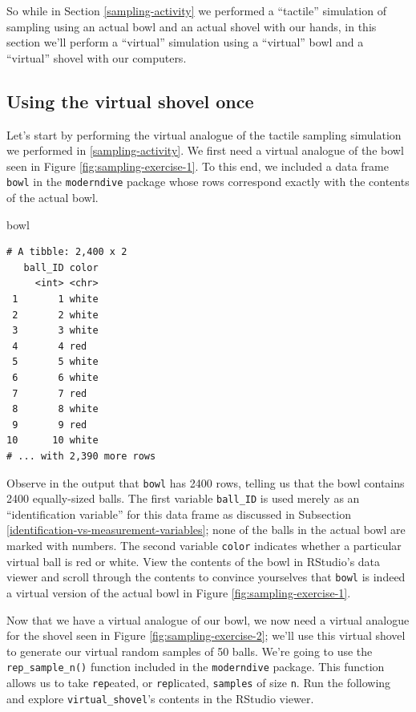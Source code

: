 \documentclass[12pt, krantz2,]{krantz}
\makeatletter
\newenvironment{Shaded}{\begin{snugshade}}{\end{snugshade}}
\newcommand{\NormalTok}[1]{#1}
\newenvironment{kframe}{%
\medskip{}
\setlength{\fboxsep}{.8em}
 \def\at@end@of@kframe{}%
 \ifinner\ifhmode%
  \def\at@end@of@kframe{\end{minipage}}%
  \begin{minipage}{\columnwidth}%
 \fi\fi%
 \def\FrameCommand##1{\hskip\@totalleftmargin \hskip-\fboxsep
 \colorbox{shadecolor}{##1}\hskip-\fboxsep
     \hskip-\linewidth \hskip-\@totalleftmargin \hskip\columnwidth}%
 \MakeFramed {\advance\hsize-\width
   \@totalleftmargin\z@ \linewidth\hsize
   \@setminipage}}%
 {\par\unskip\endMakeFramed%
 \at@end@of@kframe}
\renewenvironment{Shaded}{\begin{kframe}}{\end{kframe}}
\makeatother
\begin{document}
So while in Section \ref{sampling-activity} we performed a ``tactile'' simulation of sampling using an actual bowl and an actual shovel with our hands, in this section we'll perform a ``virtual'' simulation using a ``virtual'' bowl and a ``virtual'' shovel with our computers.

\hypertarget{using-the-virtual-shovel-once}{%
\subsection{Using the virtual shovel once}\label{using-the-virtual-shovel-once}}

Let's start by performing the virtual analogue of the tactile sampling simulation we performed in \ref{sampling-activity}. We first need a virtual analogue of the bowl seen in Figure \ref{fig:sampling-exercise-1}. To this end, we included a data frame \texttt{bowl} in the \texttt{moderndive} package whose rows correspond exactly with the contents of the actual bowl.

\begin{Shaded}
\begin{Highlighting}[]
\NormalTok{bowl}
\end{Highlighting}
\end{Shaded}

\begin{verbatim}
# A tibble: 2,400 x 2
   ball_ID color
     <int> <chr>
 1       1 white
 2       2 white
 3       3 white
 4       4 red  
 5       5 white
 6       6 white
 7       7 red  
 8       8 white
 9       9 red  
10      10 white
# ... with 2,390 more rows
\end{verbatim}

Observe in the output that \texttt{bowl} has 2400 rows, telling us that the bowl contains 2400 equally-sized balls. The first variable \texttt{ball\_ID} is used merely as an ``identification variable'' for this data frame as discussed in Subsection \ref{identification-vs-measurement-variables}; none of the balls in the actual bowl are marked with numbers. The second variable \texttt{color} indicates whether a particular virtual ball is red or white. View the contents of the bowl in RStudio's data viewer and scroll through the contents to convince yourselves that \texttt{bowl} is indeed a virtual version of the actual bowl in Figure \ref{fig:sampling-exercise-1}.

Now that we have a virtual analogue of our bowl, we now need a virtual analogue for the shovel seen in Figure \ref{fig:sampling-exercise-2}; we'll use this virtual shovel to generate our virtual random samples of 50 balls. We're going to use the \texttt{rep\_sample\_n()} function included in the \texttt{moderndive} package. This function allows us to take \texttt{rep}eated, or \texttt{rep}licated, \texttt{samples} of size \texttt{n}. Run the following and explore \texttt{virtual\_shovel}'s contents in the RStudio viewer.
\end{document}
